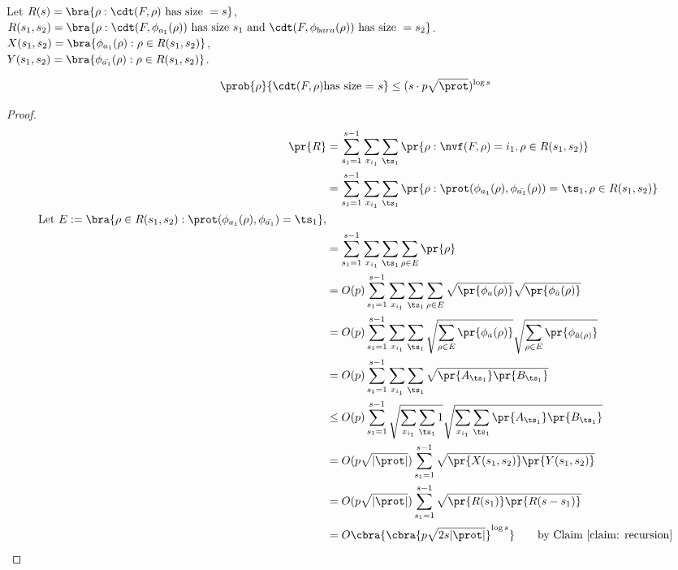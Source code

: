 Let $R(s) = \bra{\rho: \cdt(F,\rho) \text{ has size } = s}$,\\ 
$R(s_1,s_2) = \bra{\rho: \cdt(F,\phi_{a_1}(\rho)) \text{ has size } s_1 \text{ and } \cdt(F,\phi_{bar{a}}(\rho)) \text{ has size } = s_2}$.\\
$X(s_1,s_2) = \bra{\phi_{a_1}(\rho) : \rho \in R(s_1,s_2)}$,\\
$Y(s_1,s_2) = \bra{\phi_{\bar{a_1}}(\rho): \rho \in R(s_1,s_2)}$.\\
\begin{claim}
    $$\prob{\rho}{\cdt(F,\rho) \text{has size = } s} \leq (s \cdot p\sqrt{\prot})^{\log s}$$
\end{claim}
\begin{proof}
\begin{align*}
   \pr{R} &= \sum_{s_1 = 1}^{s-1}
                \sum_{x_{i_1}} 
                    \sum_{\ts_1} \pr{\rho: \nvf(F,\rho) = i_1, \rho \in R(s_1,s_2)}\\
        &= \sum_{s_1 = 1}^{s-1}
            \sum_{x_{i_1}} 
                \sum_{\ts_1} \pr{\rho: \prot( \phi_{a_1}(\rho),                \phi_{\bar{a_1}}(\rho) ) = \ts_1, \rho \in R(s_1,s_2)}\\
    \text{Let } E :=\bra{\rho \in R(s_1,s_2): \prot(\phi_{a_1}(\rho), \phi_{\bar{a_1}}) = \ts_1}, \\                
        &= \sum_{s_1 = 1}^{s-1}
            \sum_{x_{i_1}}        
                \sum_{\ts_1} \sum_{\rho \in E} \pr{\rho}\\
        &= O(p) \sum_{s_1 = 1}^{s-1}
                \sum_{x_{i_1}}
                \sum_{\ts_1} \sum_{\rho \in E} \sqrt{ \pr{\phi_{a}(\rho)}} \sqrt{\pr{\phi_{\bar{a}}(\rho)} } \\
        &= O(p) \sum_{s_1 = 1}^{s-1}
                \sum_{x_{i_1}}
                \sum_{\ts_1} \sqrt{\sum_{\rho \in E} \pr{\phi_{a}(\rho)}} \sqrt{\sum_{\rho \in E} \pr{\phi_{\bar{a}(\rho)}}}\\
        &= O(p) \sum_{s_1 = 1}^{s-1}
            \sum_{x_{i_1}} \sum_{\ts_1} \sqrt{\pr{A_{\ts_1}} \pr{B_{\ts_1}}}\\
        &\leq O(p) \sum_{s_1 = 1}^{s-1}
                \sqrt{\sum_{x_{i_1}} \sum_{\ts_1} 1 } \sqrt{\sum_{x_{i_1}} \sum_{\ts_1} \pr{A_{\ts_1}} \pr{B_{\ts_1}}} \\
        & = O(p \sqrt{|\prot|}) \sum_{s_1 =1}^{s-1}\sqrt{\pr{X(s_1,s_2)} \pr{Y(s_1,s_2)}} \\
        &= O(p \sqrt{|\prot|}) \sum_{s_1 = 1}^{s -1}\sqrt{\pr{R(s_1)} \pr{R(s -s_1)}}\\
        &= O\cbra{\cbra{p \sqrt{2s|\prot|}}^{\log s}} \tag*{by Claim \ref{claim: recursion}}
\end{align*}
\end{proof}

